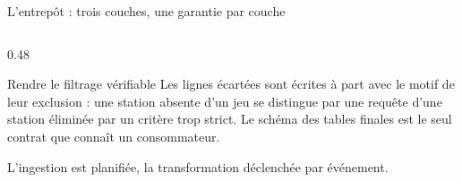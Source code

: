 \documentclass[aspectratio=169,11pt]{beamer}
\begin{document}
\begin{frame}{L'entrepôt : trois couches, une garantie par couche}
\begin{columns}[T]
\begin{column}{0.48\textwidth}
\begin{apport}{Rendre le filtrage vérifiable}
Les lignes écartées sont écrites à part avec le motif de leur exclusion : une station absente
d'un jeu se distingue par une requête d'une station éliminée par un critère trop strict. Le
schéma des tables finales est le seul contrat que connaît un consommateur.
\end{apport}

\vspace{0.2em}
{\footnotesize {} \textbullet{}
 \textbullet{} \par
\color{grisardoise} L'ingestion est planifiée, la transformation déclenchée par événement.\par}
\end{column}
\end{columns}
\end{frame}
\end{document}
